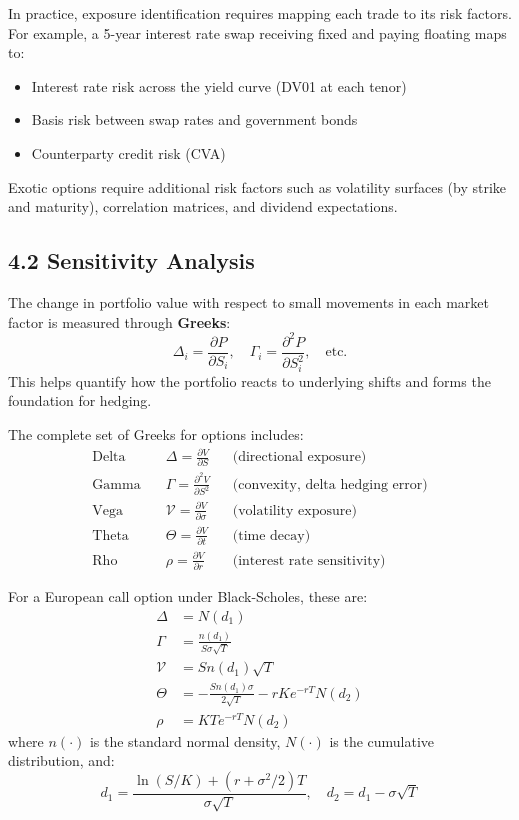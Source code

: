 \documentclass[11pt,a4paper]{article}
\begin{document}
In practice, exposure identification requires mapping each trade to its risk factors. For example, a 5-year interest rate swap receiving fixed and paying floating maps to:
\begin{itemize}
    \item Interest rate risk across the yield curve (DV01 at each tenor)
    \item Basis risk between swap rates and government bonds
    \item Counterparty credit risk (CVA)
\end{itemize}
Exotic options require additional risk factors such as volatility surfaces (by strike and maturity), correlation matrices, and dividend expectations.

\subsection*{4.2 Sensitivity Analysis}

The change in portfolio value with respect to small movements in each market factor is measured through \textbf{Greeks}:
\[
\Delta_i = \frac{\partial P}{\partial S_i}, \quad \Gamma_i = \frac{\partial^2 P}{\partial S_i^2}, \quad \text{etc.}
\]
This helps quantify how the portfolio reacts to underlying shifts and forms the foundation for hedging.

The complete set of Greeks for options includes:
\begin{align*}
\text{Delta} \quad &\Delta = \frac{\partial V}{\partial S} &&\text{(directional exposure)}\\
\text{Gamma} \quad &\Gamma = \frac{\partial^2 V}{\partial S^2} &&\text{(convexity, delta hedging error)}\\
\text{Vega} \quad &\mathcal{V} = \frac{\partial V}{\partial \sigma} &&\text{(volatility exposure)}\\
\text{Theta} \quad &\Theta = \frac{\partial V}{\partial t} &&\text{(time decay)}\\
\text{Rho} \quad &\rho = \frac{\partial V}{\partial r} &&\text{(interest rate sensitivity)}
\end{align*}

For a European call option under Black-Scholes, these are:
\begin{align*}
\Delta &= N(d_1) \\
\Gamma &= \frac{n(d_1)}{S\sigma\sqrt{T}} \\
\mathcal{V} &= S n(d_1) \sqrt{T} \\
\Theta &= -\frac{S n(d_1) \sigma}{2\sqrt{T}} - rKe^{-rT}N(d_2) \\
\rho &= KTe^{-rT}N(d_2)
\end{align*}
where $n(\cdot)$ is the standard normal density, $N(\cdot)$ is the cumulative distribution, and:
\[
d_1 = \frac{\ln(S/K) + (r + \sigma^2/2)T}{\sigma\sqrt{T}}, \quad d_2 = d_1 - \sigma\sqrt{T}
\]
\end{document}

